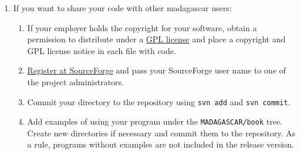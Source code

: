 \begin{enumerate}
\item If you want to share your code with other madagascar users:
\begin{enumerate}
\item If your employer holds the copyright for your software, obtain a permission to distribute under a \href{http://www.gnu.org/copyleft/gpl.html}{GPL license} and 
place a copyright and GPL license notice in each file with code.
\item \href{http://sourceforge.net/account/newuser_emailverify.php}{Register at SourceForge}
and pass your SourceForge user name to one of the project
administrators.  \item Commit your directory to the repository using
\texttt{svn add} and \texttt{svn commit}.  \item Add examples of using your program
under the \texttt{MADAGASCAR/book} tree. Create new directories if
necessary and commit them to the repository. As a rule, programs
without examples are not included in the release version.
\end{enumerate}
\end{enumerate}
